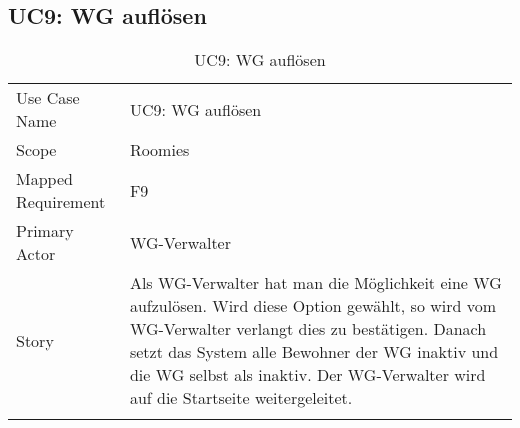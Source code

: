 \subsection{UC9: WG auflösen}
\begin{table}[H]
	\tablestyle
	\tablealtcolored
	\begin{tabularx}{\textwidth}{lX}
		\tablebody
			Use Case Name &
			UC9: WG auflösen
			\tabularnewline
			Scope &
			Roomies
			\tabularnewline
			Mapped Requirement &
			F9
			\tabularnewline
			Primary Actor &
			WG-Verwalter
			\tabularnewline
			Story &
			Als WG-Verwalter hat man die Möglichkeit eine WG aufzulösen. Wird diese Option gewählt, so wird vom WG-Verwalter verlangt dies zu bestätigen. Danach setzt das System alle Bewohner der WG inaktiv und die WG selbst als inaktiv. Der WG-Verwalter wird auf die Startseite weitergeleitet.
			\tabularnewline
		\tableend
	\end{tabularx}
	\caption{UC9: WG auflösen}
\end{table}


